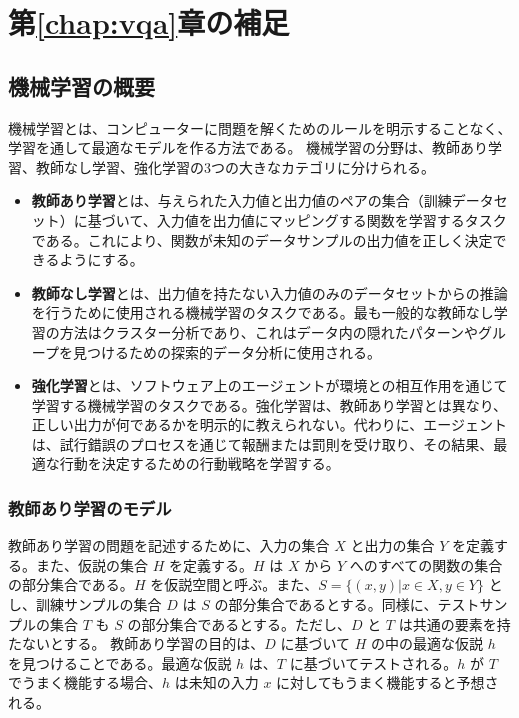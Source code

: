 \chapter{第\ref{chap:vqa}章の補足}
\section{機械学習の概要}\label{sec:machine-learning}
機械学習とは、コンピューターに問題を解くためのルールを明示することなく、学習を通して最適なモデルを作る方法である。
機械学習の分野は、教師あり学習、教師なし学習、強化学習の3つの大きなカテゴリに分けられる。

\begin{itemize}
    \item \textbf{教師あり学習}とは、与えられた入力値と出力値のペアの集合（訓練データセット）に基づいて、入力値を出力値にマッピングする関数を学習するタスクである。これにより、関数が未知のデータサンプルの出力値を正しく決定できるようにする。
    \item \textbf{教師なし学習}とは、出力値を持たない入力値のみのデータセットからの推論を行うために使用される機械学習のタスクである。最も一般的な教師なし学習の方法はクラスター分析であり、これはデータ内の隠れたパターンやグループを見つけるための探索的データ分析に使用される。
    \item \textbf{強化学習}とは、ソフトウェア上のエージェントが環境との相互作用を通じて学習する機械学習のタスクである。強化学習は、教師あり学習とは異なり、正しい出力が何であるかを明示的に教えられない。代わりに、エージェントは、試行錯誤のプロセスを通じて報酬または罰則を受け取り、その結果、最適な行動を決定するための行動戦略を学習する。
\end{itemize}


\subsection{教師あり学習のモデル}
教師あり学習の問題を記述するために、入力の集合 $X$ と出力の集合 $Y$ を定義する。また、仮説の集合 $H$ を定義する。$H$ は $X$ から $Y$ へのすべての関数の集合の部分集合である。$H$ を仮説空間と呼ぶ。また、$S = \{(x,y)|x\in X, y\in Y\}$ とし、訓練サンプルの集合 $D$ は $S$ の部分集合であるとする。同様に、テストサンプルの集合 $T$ も $S$ の部分集合であるとする。ただし、$D$ と $T$ は共通の要素を持たないとする。
教師あり学習の目的は、$D$ に基づいて $H$ の中の最適な仮説 $h$ を見つけることである。最適な仮説 $h$ は、$T$ に基づいてテストされる。$h$ が $T$ でうまく機能する場合、$h$ は未知の入力 $x$ に対してもうまく機能すると予想される。

